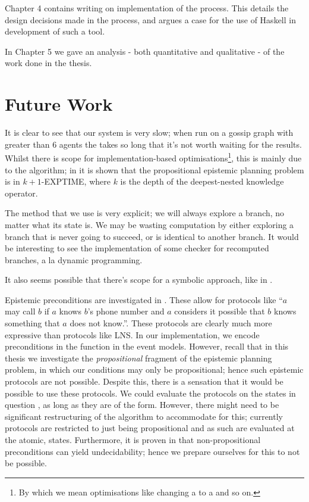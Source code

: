 \documentclass[10pt, a4paper]{report}
\begin{document}
Chapter 4 contains writing on implementation of the process. This details the
design decisions made in the process, and argues a case for the use of Haskell
in development of such a tool. 

In Chapter 5 we gave an analysis - both quantitative and qualitative - of the
work done in the thesis. 

\section{Future Work}

It is clear to see that our system is very slow; when run on a gossip graph with
greater than 6 agents the takes so long that it's not worth waiting for the
results. Whilst there is scope for implementation-based
optimisations\footnote{By which we mean optimisations like changing a
   to a  and so on.}, this is mainly due to the
algorithm; in \cite{AutomataTechniques} it is shown that the propositional
epistemic planning problem is in \textsf{$k + 1$-EXPTIME}, where $k$ is the
depth of the deepest-nested knowledge operator. 

The method that we use is very explicit; we will always explore a branch, no
matter what its state is. We may be wasting computation by either exploring a
branch that is never going to succeed, or is identical to another branch. It
would be interesting to see the implementation of some checker for recomputed
branches, a la dynamic programming.

\bigskip

It also seems possible that there's scope for a symbolic approach, like in
\cite{MalvinThesis}.

\bigskip

Epistemic preconditions are investigated in \cite{EpProforDyGo}. These allow for
protocols like ``$a$ may call $b$ if $a$ knows $b$'s phone number and $a$
considers it possible that $b$ knows something that $a$ does not know.''. These
protocols are clearly much more expressive than protocols like \textsf{LNS}. In
our implementation, we encode preconditions in the \tpre function in the event
models. However, recall that in this thesis we investigate the
\emph{propositional} fragment of the epistemic planning problem, in which our
\tpre conditions may only be propositional; hence such epistemic protocols are
not possible. Despite this, there is a sensation that it would be possible to
use these protocols. We could evaluate the protocols on the states in question
, as long as they are of the  form. However, there might need to be
significant restructuring of the algorithm to accommodate for this; currently
protocols are restricted to just being propositional and as such are evaluated
at the atomic,  states. Furthermore, it is proven in
\cite{UndecidabilityEP} that non-propositional preconditions can yield
undecidability; hence we prepare ourselves for this to not be possible. 


\newpage

\printbibliography[title={Bibliography}]
\end{document}
